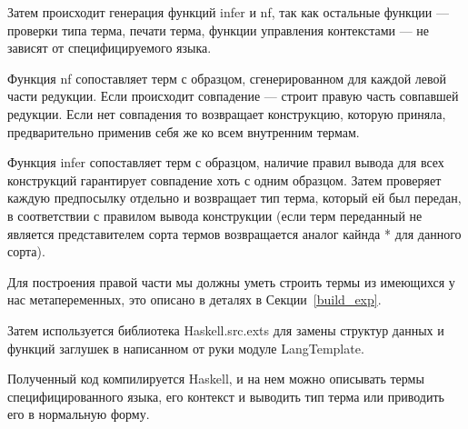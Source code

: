 Затем происходит генерация функций infer и nf, так как остальные функции --- проверки типа терма, печати терма, функции управления контекстами --- не зависят от специфицируемого языка.

Функция nf сопоставляет терм с образцом, сгенерированном для каждой левой части редукции. Если происходит совпадение --- строит правую часть совпавшей редукции. Если нет совпадения то возвращает конструкцию, которую приняла, предварительно применив себя же ко всем внутренним термам.

Функция infer сопоставляет терм с образцом, наличие правил вывода для всех конструкций гарантирует совпадение хоть с одним образцом. Затем проверяет каждую предпосылку отдельно и возвращает тип терма, который ей был передан, в соответствии с правилом вывода конструкции (если терм переданный не является представителем сорта термов возвращается аналог кайнда * для данного сорта).

Для построения правой части мы должны уметь строить термы из имеющихся у нас метапеременных, это описано в деталях в Секции~\ref{build_exp}.

Затем используется библиотека Haskell.src.exts\cite{src_exts} для замены структур данных и функций заглушек в написанном от руки модуле LangTemplate.

Полученный код компилируется Haskell, и на нем можно описывать термы специфицированного языка, его контекст и выводить тип терма или приводить его в нормальную форму.










